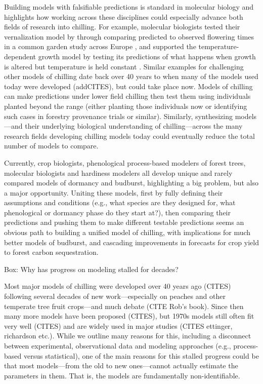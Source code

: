 \documentclass[11pt]{article}
\begin{document}
Building models with falsifiable predictions is standard in molecular biology and highlights how working across these disciplines could especially advance both fields of research into chilling. For example, molecular biologists tested their vernalization model by through comparing predicted to observed flowering times in a common garden study across Europe \citep[][]{Wilczek:2009oa}, and supported the temperature-dependent growth model by testing its predictions of what happens when growth is altered but temperature is held constant \citep{zhao2020temperature}. Similar examples for challenging other models of chilling date back over 40 years to when many of the models used today were developed (addCITES), but could take place now. Models of chilling can make predictions under lower field chilling then test them using individuals planted beyond the range (either planting those individuals now or identifying such cases in forestry provenance trials or similar). Similarly, synthesizing models---and their underlying biological understanding of chilling---across the many research fields developing chilling models today could eventually reduce the total number of models to compare. 

Currently, crop biologists, phenological process-based modelers of forest trees, molecular biologists and hardiness modelers all develop unique and rarely compared models of dormancy and budburst, highlighting a big problem, but also a major opportunity. Uniting these models, first by fully defining their assumptions and conditions (e.g., what species are they designed for, what phenological or dormancy phase do they start at?), then comparing their predictions and pushing them to make different testable predictions seems an obvious path to building a unified model of chilling, with implications for much better models of budburst, and cascading improvements in forecasts for crop yield to forest carbon sequestration. 


\vspace{10ex}

{\sc Box: Why has progress on modeling stalled for decades?} %

Most major models of chilling were developed over 40 years ago (CITES) following several decades of new work---especially on peaches and other temperate tree fruit crops---and much debate (CITE Rob's book). Since then many more models have been proposed (CITES), but 1970s models still often fit very well (CITES) and are widely used in major studies (CITES ettinger, richardson etc.). While we outline many reasons for this, including a disconnect between experimental, observational data and modeling approaches (e.g., process-based versus statistical), one of the main reasons for this stalled progress could be that most models---from the old to new ones---cannot actually estimate the parameters in them. That is, the models are fundamentally non-identifiable.
\end{document}
